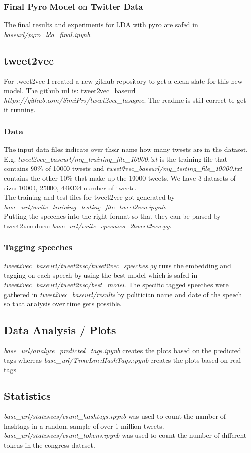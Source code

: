 \documentclass[10pt,conference,compsocconf]{IEEEtran}
\begin{document}
\subsubsection{Final Pyro Model on Twitter Data}
The final results and experiments for LDA with pyro are safed in \textit{baseurl/pyro\_lda\_final.ipynb}.

\subsection{tweet2vec}
For tweet2vec I created a new github repository to get a clean slate for this new model. The github url is: tweet2vec\_baseurl = \textit{https://github.com/SimiPro/tweet2vec\_lasagne}. The readme is still correct to get it running.
\subsubsection{Data}
 The input data files indicate over their name how many tweets are in the dataset. E.g. \textit{tweet2vec\_baseurl/my\_training\_file\_10000.txt} is the training file that contains 90\% of 10000 tweets and \textit{tweet2vec\_baseurl/my\_testing\_file\_10000.txt} contains the other 10\% that make up the 10000 tweets. We have 3 datasets of size: 10000, 25000, 449334 number of tweets. \\
 The training and test files for tweet2vec got generated by \textit{base\_url/write\_training\_testing\_file\_tweet2vec.ipynb}.\\
 Putting the speeches into the right format so that they can be parsed by tweet2vec does: \textit{base\_url/write\_speeches\_2tweet2vec.py}.

\subsubsection{Tagging speeches}
\textit{tweet2vec\_baseurl/tweet2vec/tweet2vec\_speeches.py} runs the embedding and tagging on each speech by using the best model which is safed in \textit{tweet2vec\_baseurl/tweet2vec/best\_model}. The specific tagged speeches were gathered in \textit{tweet2vec\_baseurl/results} by politician name and date of the speech so that analysis over time gets possible.

\subsection{Data Analysis / Plots}
 \textit{base\_url/analyze\_predicted\_tags.ipynb} creates the plots based on the predicted tags whereas  \textit{base\_url/TimeLineHashTags.ipynb} creates the plots based on real tags. 
 
\subsection{Statistics}
\textit{base\_url/statistics/count\_hashtags.ipynb} was used to count the number of hashtags in a random sample of over 1 million tweets. 
\textit{base\_url/statistics/count\_tokens.ipynb} was used to count the number of different tokens in the congress dataset. 






\end{document}
